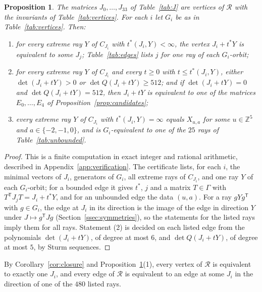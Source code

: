 \documentclass[11pt]{amsart}
\newtheorem{proposition}[theorem]{Proposition}
\theoremstyle{definition}
\theoremstyle{remark}
\numberwithin{equation}{section}
\numberwithin{table}{section}
\numberwithin{figure}{section}
\newcommand{\Z}{\mathbb{Z}}
\newcommand{\Rk}{\mathcal{R}}
\newcommand{\T}{\mathsf{T}}
\begin{document}
\begin{proposition}\label{prop:computation}
The matrices $J_0,\dots,J_{33}$ of Table~\ref{tab:J} are vertices of $\Rk$ with the invariants of Table~\ref{tab:vertices}. For each $i$ let $G_i$ be as in Table~\ref{tab:vertices}. Then:
\begin{enumerate}
\item for every extreme ray $Y$ of $C_{J_i}$ with $t^*(J_i,Y)<\infty$, the vertex $J_i+t^*Y$ is equivalent to some $J_j$; Table~\ref{tab:edges} lists $j$ for one ray of each $G_i$-orbit;
\item for every extreme ray $Y$ of $C_{J_i}$ and every $t\ge0$ with $t\le t^*(J_i,Y)$, either $\det(J_i+tY)>0$ or $\det Q(J_i+tY)\ge512$; and if $\det(J_i+tY)=0$ and $\det Q(J_i+tY)=512$, then $J_i+tY$ is equivalent to one of the matrices $E_0,\dots,E_4$ of Proposition~\ref{prop:candidates};
\item every extreme ray $Y$ of $C_{J_i}$ with $t^*(J_i,Y)=\infty$ equals $X_{u,a}$ for some $u\in\Z^5$ and $a\in\{-2,-1,0\}$, and is $G_i$-equivalent to one of the $25$ rays of Table~\ref{tab:unbounded}.
\end{enumerate}
\end{proposition}

\begin{proof}
This is a finite computation in exact integer and rational arithmetic, described in Appendix~\ref{app:verification}. The certificate lists, for each $i$, the minimal vectors of $J_i$, generators of $G_i$, all extreme rays of $C_{J_i}$, and one ray $Y$ of each $G_i$-orbit; for a bounded edge it gives $t^*$, $j$ and a matrix $T\in\Gamma$ with $T^\T J_jT=J_i+t^*Y$, and for an unbounded edge the data $(u,a)$. For a ray $gYg^\T$ with $g\in G_i$, the edge at $J_i$ in its direction is the image of the edge in direction $Y$ under $J\mapsto g^\T Jg$ (Section~\ref{ssec:symmetries}), so the statements for the listed rays imply them for all rays. Statement (2) is decided on each listed edge from the polynomials $\det(J_i+tY)$, of degree at most $6$, and $\det Q(J_i+tY)$, of degree at most $5$, by Sturm sequences.
\end{proof}

By Corollary~\ref{cor:closure} and Proposition~\ref{prop:computation}(1), every vertex of $\Rk$ is equivalent to exactly one $J_i$, and every edge of $\Rk$ is equivalent to an edge at some $J_i$ in the direction of one of the $480$ listed rays.
\end{document}
